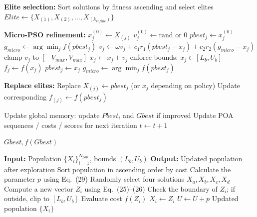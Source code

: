 \documentclass[a4paper,12pt]{article}
\begin{document}
\begin{algorithm}
\begin{algorithmic}[1]
    \vspace{0.3em}
    \State \textbf{Elite selection:}
    \State Sort solutions by fitness ascending and select elites
    \State $Elite \leftarrow \{X_{(1)}, X_{(2)}, \dots, X_{(k_{refine})}\}$

    \vspace{0.3em}
    \State \textbf{Micro-PSO refinement:}
        \State $x_j^{(0)} \leftarrow X_{(j)}$
        \State $v_j^{(0)} \leftarrow \text{rand or }0$
        \State $pbest_j \leftarrow x_j^{(0)}$
    \EndFor
    \State $g_{micro} \leftarrow \arg\min_j f(pbest_j)$
            \State $v_j \leftarrow \omega v_j + c_1 r_1 (pbest_j - x_j) + c_2 r_2 (g_{micro} - x_j)$
            \State clamp $v_j$ to $[-V_{max},V_{max}]$
            \State $x_j \leftarrow x_j + v_j$
            \State enforce bounds: $x_j \in [L_b,U_b]$
            \State $f_j \leftarrow f(x_j)$
                \State $pbest_j \leftarrow x_j$
            \EndIf
        \EndFor
        \State $g_{micro} \leftarrow \arg\min_j f(pbest_j)$
    \EndFor

    \vspace{0.3em}
    \State \textbf{Replace elites:}
        \State Replace $X_{(j)} \leftarrow pbest_j$ (or $x_j$ depending on policy)
        \State Update corresponding $f_{(j)} \leftarrow f(pbest_j)$
    \EndFor

    \vspace{0.3em}
    \State Update global memory: update $Pbest_i$ and $Gbest$ if improved
    \State Update POA sequences / costs / scores for next iteration
    \State $t \leftarrow t + 1$
\EndWhile

\State \Return $Gbest, f(Gbest)$
\end{algorithmic}
\end{algorithm}

\begin{algorithm}[h!]
\footnotesize
\caption{Pseudo-code of the Exploration Phase of PUMA}
\label{alg:po_explore}
\begin{algorithmic}[1]
\State \textbf{Input:} Population $\{X_i\}_{i=1}^{N_{pop}}$, bounds $(L_b,U_b)$
\State \textbf{Output:} Updated population after exploration
\vspace{0.2em}
\State Sort population in ascending order by cost
\State Calculate the parameter $p$ using Eq.~(29)
    \State Randomly select four solutions $X_a,X_b,X_c,X_d$
    \State Compute a new vector $Z_i$ using Eq.~(25)--(26)
    \State Check the boundary of $Z_i$; if outside, clip to $[L_b,U_b]$
    \State Evaluate cost $f(Z_i)$
        \State $X_i \leftarrow Z_i$ 
    \Else
        \State $U \leftarrow U + p$ 
    \EndIf
\EndFor
\State \Return Updated population $\{X_i\}$
\end{algorithmic}
\end{algorithm}
\end{document}
